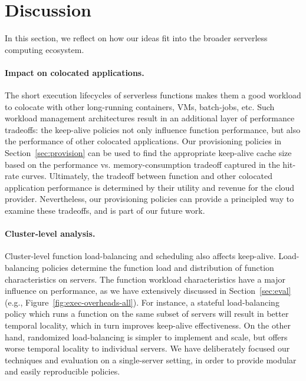 \section{Discussion}
\label{sec:disc}

In this section, we reflect on how our ideas fit into the broader serverless computing ecosystem. 

\paragraph{Impact on colocated applications.}
The short execution lifecycles of serverless functions makes them a good workload to colocate with other long-running containers, VMs, batch-jobs, etc.
Such workload management architectures result in an additional layer of performance tradeoffs: the keep-alive policies not only influence function performance, but also the performance of other colocated applications.
Our provisioning policies in Section~\ref{sec:provision} can be used to find the appropriate keep-alive cache size based on the performance vs. memory-consumption tradeoff captured in the hit-rate curves.
Ultimately, the tradeoff between function and other colocated application performance is determined by their utility and revenue for the cloud provider. 
Nevertheless, our provisioning policies can provide a principled way to examine these tradeoffs, and is part of our future work.
 

\paragraph{Cluster-level analysis.}
Cluster-level function load-balancing and scheduling also affects keep-alive. 
Load-balancing policies determine the function load and distribution of function characteristics on servers. 
The function workload characteristics have a major influence on performance, as we have extensively discussed in Section~\ref{sec:eval} (e.g., Figure~\ref{fig:exec-overheads-all}). 
For instance, a stateful load-balancing policy which runs a function on the same subset of servers will result in better temporal locality, which in turn improves keep-alive effectiveness.
On the other hand, randomized load-balancing is simpler to implement and scale, but offers worse temporal locality to individual servers. 
We have deliberately focused our techniques and evaluation on a single-server setting, in order to provide modular and easily reproducible policies. 


